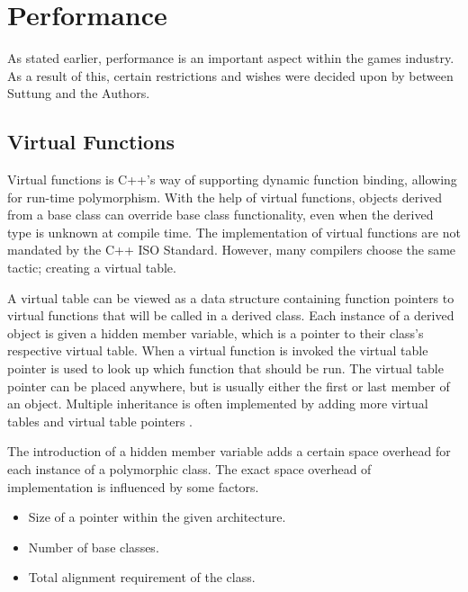 \section{Performance}
As stated earlier, performance is an important aspect within the games industry.
As a result of this, certain restrictions and wishes were decided upon by between Suttung and the Authors.

\subsection{Virtual Functions}
\label{subsec:requirements_performance_virtual_functions}
Virtual functions is C++'s way of supporting dynamic function binding, allowing for run-time polymorphism.
With the help of virtual functions, objects derived from a base class can override base class functionality,
even when the derived type is unknown at compile time.
The implementation of virtual functions are not mandated by the C++ ISO Standard.
However, many compilers choose the same tactic; creating a virtual table\cite{wikipedia_virtual_method_table}\cite[p. 140]{game_engine_architecture}.

A virtual table can be viewed as a data structure containing function pointers to virtual functions that will be called in a derived class.
Each instance of a derived object is given a hidden member variable, which is a pointer to their class's respective virtual table.
When a virtual function is invoked the virtual table pointer is used to look up which function that should be run.
The virtual table pointer can be placed anywhere, but is usually either the first or last member of an object.
Multiple inheritance is often implemented by adding more virtual tables and virtual table pointers\cite{codersource_virtual_functions}
\cite[31:12]{andrei_alexandrescu_quick_code_quickly}.

The introduction of a hidden member variable adds a certain space overhead for each instance of a polymorphic class.
The exact space overhead of implementation is influenced by some factors.
\begin{itemize}
    \item
    Size of a pointer within the given architecture.

    \item
    Number of base classes.

    \item
    Total alignment requirement of the class.
\end{itemize}

